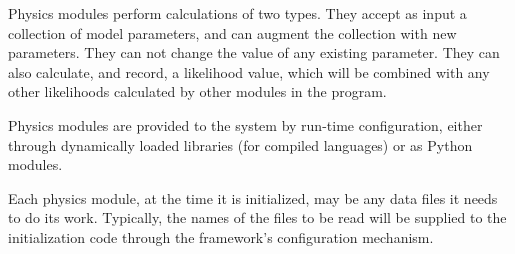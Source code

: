 \documentclass[draftmode,draftwater]{memarticle}
\begin{document}
Physics modules perform calculations of two types. They accept as
input a collection of model parameters, and can augment the collection
with new parameters. They can not change the value of any existing
parameter. They can also calculate, and record, a likelihood value,
which will be combined with any other likelihoods calculated by other
modules in the program.

Physics modules are provided to the system by run-time configuration,
either through dynamically loaded libraries (for compiled languages)
or as Python modules.

Each physics module, at the time it is initialized, may be any data
files it needs to do its work. Typically, the names of the files to be
read will be supplied to the initialization code through the
framework's configuration mechanism.

\end{document}
